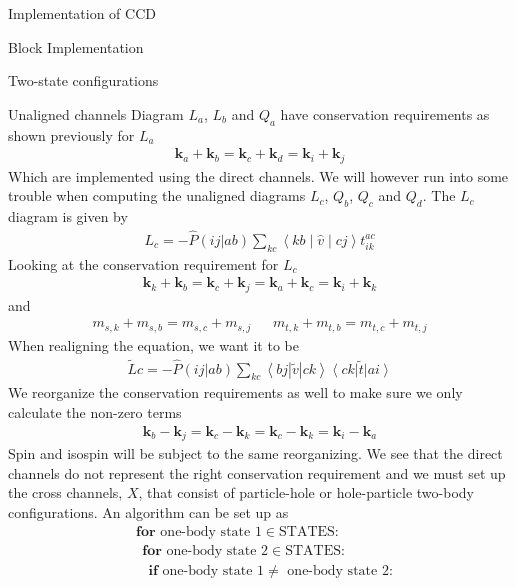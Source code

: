 \documentclass[twoside,english]{uiofysmaster}
\begin{document}
\begin{chapter}{Implementation of CCD}
\begin{section}{Block Implementation}
\begin{subsection}{Two-state configurations}
		\end{subsection}
		
		\begin{subsection}{Unaligned channels}
			Diagram $L_a$, $L_b$ and $Q_a$ have conservation requirements as shown previously for $L_a$
			\begin{align}
			 	\mathbf{k}_a + \mathbf{k}_b = \mathbf{k}_c + \mathbf{k}_d = \mathbf{k}_i + \mathbf{k}_j 
			\end{align}
			Which are implemented using the direct channels. We will however run into some trouble when computing the unaligned diagrams $L_c$, $Q_b$, $Q_c$ and $Q_d$. The $L_c$ diagram is given by 
			\begin{align}
				L_c = - \hat P(ij|ab) \sum_{kc} \left<kb\middle|\hat v\middle| cj \right> t_{ik}^{ac}
			\end{align}
			Looking at the conservation requirement for $L_c$
			\begin{align}
				\mathbf{k}_k + \mathbf{k}_b = \mathbf{k}_c + \mathbf{k}_j = \mathbf{k}_a + \mathbf{k}_c = \mathbf{k}_i + \mathbf{k}_k
			\end{align}
			and 
			\begin{align}
				m_{s,k} + m_{s,b} = m_{s,c} + m_{s,j}  \:\:\:\:\:\:\: m_{t,k} + m_{t,b} = m_{t,c} + m_{t,j} 
			\end{align}
			When realigning the equation, we want it to be
			\begin{align}
				\tilde Lc = -\hat P(ij|ab) \sum_{kc} \left<bj | \tilde v | ck \right> \left< ck \right| \tilde t \left| ai \right>
			\end{align}
			We reorganize the conservation requirements as well to make sure we only calculate the non-zero terms
			\begin{align}
				\mathbf{k}_b - \mathbf{k}_j = \mathbf{k}_c - \mathbf{k}_k = \mathbf{k}_c - \mathbf{k}_k = \mathbf{k}_i - \mathbf{k}_a
			\end{align}
			Spin and isospin will be subject to the same reorganizing. We see that the direct channels do not represent the right conservation requirement and we must set up the cross channels, $X$, that consist of particle-hole or hole-particle two-body configurations. An algorithm can be set up as
			\begin{align*}
				&\mathbf{for } \text{ one-body state 1} \in \text{STATES}:\\
				&\:\: \mathbf{for } \text{ one-body state 2} \in \text{STATES}:\\
				&\:\:\:\: \mathbf{if} \text{ one-body state 1} \neq \text{ one-body state 2}:\\

\end{align*}
\end{subsection}
\end{section}
\end{chapter}
\end{document}
